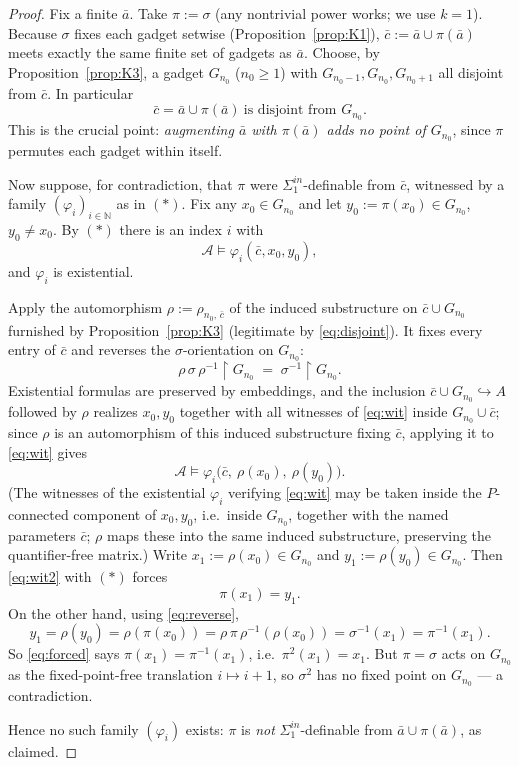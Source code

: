 \documentclass[12pt,fullpage]{article}
\theoremstyle{definition}
\newcommand{\A}{\mathcal{A}}
\newcommand{\N}{\mathbb{N}}
\renewcommand{\phi}{\varphi}
\begin{document}
\begin{proof}
Fix a finite $\bar a$.  Take $\pi:=\sigma$ (any nontrivial power works; we use
$k=1$).  Because $\sigma$ fixes each gadget setwise (Proposition~\ref{prop:K1}),
$\bar c:=\bar a\cup\pi(\bar a)$ meets exactly the same finite set of gadgets as
$\bar a$.  Choose, by Proposition~\ref{prop:K3}, a gadget $G_{n_0}$ ($n_0\ge1$)
with $G_{n_0-1},G_{n_0},G_{n_0+1}$ all disjoint from $\bar c$.  In particular
\[
\bar c=\bar a\cup\pi(\bar a)\ \text{is disjoint from } G_{n_0}.
\tag{1}\label{eq:disjoint}
\]
This is the crucial point: \emph{augmenting $\bar a$ with $\pi(\bar a)$ adds
no point of $G_{n_0}$}, since $\pi$ permutes each gadget within itself.

Now suppose, for contradiction, that $\pi$ were $\Sigma^{in}_1$-definable
from $\bar c$, witnessed by a family $(\phi_i)_{i\in\N}$ as in $(\ast)$.  Fix
any $x_0\in G_{n_0}$ and let $y_0:=\pi(x_0)\in G_{n_0}$, $y_0\neq x_0$.  By
$(\ast)$ there is an index $i$ with
\[
\A\models\phi_i(\bar c,x_0,y_0),
\tag{2}\label{eq:wit}
\]
and $\phi_i$ is existential.

Apply the automorphism $\rho:=\rho_{n_0,\,\bar c}$ of the induced substructure
on $\bar c\cup G_{n_0}$ furnished by Proposition~\ref{prop:K3} (legitimate by
\eqref{eq:disjoint}).  It fixes every entry of $\bar c$ and reverses the
$\sigma$-orientation on $G_{n_0}$:
\[
\rho\,\sigma\,\rho^{-1}\restriction G_{n_0}\;=\;\sigma^{-1}\restriction G_{n_0}.
\tag{3}\label{eq:reverse}
\]
Existential formulas are preserved by embeddings, and the inclusion
$\bar c\cup G_{n_0}\hookrightarrow A$ followed by $\rho$ realizes $x_0,y_0$
together with all witnesses of \eqref{eq:wit} inside $G_{n_0}\cup\bar c$;
since $\rho$ is an automorphism of this induced substructure fixing $\bar c$,
applying it to \eqref{eq:wit} gives
\[
\A\models\phi_i\bigl(\bar c,\ \rho(x_0),\ \rho(y_0)\bigr).
\tag{4}\label{eq:wit2}
\]
(The witnesses of the existential $\phi_i$ verifying \eqref{eq:wit} may be
taken inside the $P$-connected component of $x_0,y_0$, i.e.\ inside $G_{n_0}$,
together with the named parameters $\bar c$; $\rho$ maps these into the same
induced substructure, preserving the quantifier-free matrix.)  Write
$x_1:=\rho(x_0)\in G_{n_0}$ and $y_1:=\rho(y_0)\in G_{n_0}$.  Then
\eqref{eq:wit2} with $(\ast)$ forces
\[
\pi(x_1)=y_1.
\tag{5}\label{eq:forced}
\]
On the other hand, using \eqref{eq:reverse},
\[
y_1=\rho(y_0)=\rho(\pi(x_0))=\rho\,\pi\,\rho^{-1}(\rho(x_0))
=\sigma^{-1}(x_1)=\pi^{-1}(x_1).
\]
So \eqref{eq:forced} says $\pi(x_1)=\pi^{-1}(x_1)$, i.e.\ $\pi^2(x_1)=x_1$.
But $\pi=\sigma$ acts on $G_{n_0}$ as the fixed-point-free translation
$i\mapsto i+1$, so $\sigma^2$ has no fixed point on $G_{n_0}$ --- a
contradiction.

Hence no such family $(\phi_i)$ exists: $\pi$ is \emph{not}
$\Sigma^{in}_1$-definable from $\bar a\cup\pi(\bar a)$, as claimed.
\end{proof}
\end{document}
